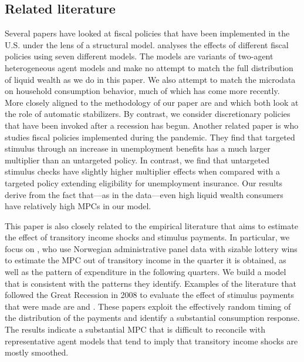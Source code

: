 \documentclass[\econtexRoot/HAFiscal]{subfiles}
\begin{document}
\hypertarget{related-literature}{}\par\subsection{Related literature}
\notinsubfile{\label{sec:lit}}

Several papers have looked at fiscal policies that have been implemented in the U.S. under the lens of a structural model. \cite{coenen2012effects} analyses the effects of different fiscal policies using seven different models. The models are variants of two-agent heterogeneous agent models and make no attempt to match the full distribution of liquid wealth as we do in this paper. We also attempt to match the microdata on household consumption behavior, much of which has come more recently.  More closely aligned to the methodology of our paper are \cite{mckay2016role} and \cite{mckay2021optimal} which both look at the role of automatic stabilizers. By contrast, we consider discretionary policies that have been invoked after a recession has begun. Another related paper is \cite{bayercoronavirus} who studies fiscal policies implemented during the pandemic. They find that targeted stimulus through an increase in unemployment benefits has a much larger multiplier than an untargeted policy. In contrast, we find that untargeted stimulus checks have slightly higher multiplier effects when compared with a targeted policy extending eligibility for unemployment insurance. Our results derive from the fact that---as in the data---even high liquid wealth consumers have relatively high MPCs in our model.

This paper is also closely related to the empirical literature that aims to estimate the effect of transitory income shocks and stimulus payments. In particular, we focus on \cite{fagereng_mpc_2021}, who use Norwegian administrative panel data with sizable lottery wins to estimate the MPC out of transitory income in the quarter it is obtained, as well as the pattern of expenditure in the following quarters. We build a model that is consistent with the patterns they identify. Examples of the literature that followed the Great Recession in 2008 to evaluate the effect of stimulus payments that were made are  \cite{parker2013consumer} and \cite{broda2014economic}. These papers exploit the effectively random timing of the distribution of the payments and identify a substantial consumption response. The results indicate a substantial MPC that is difficult to reconcile with representative agent models that tend to imply that transitory income shocks are mostly smoothed. 
\end{document}
